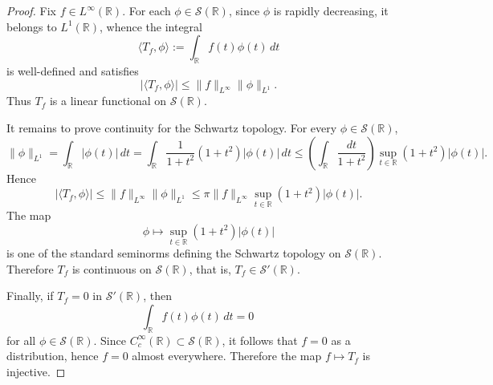 \documentclass[12pt]{amsart}
\theoremstyle{definition}
\begin{document}
\begin{proof}
Fix $f\in L^\infty(\mathbb R)$. For each $\phi\in \mathcal S(\mathbb R)$, since
$\phi$ is rapidly decreasing, it belongs to $L^1(\mathbb R)$, whence the
integral
\[
\langle T_f,\phi\rangle:=\int_{\mathbb R} f(t)\phi(t)\,dt
\]
is well-defined and satisfies
\[
|\langle T_f,\phi\rangle|
\le \|f\|_{L^\infty}\|\phi\|_{L^1}.
\]
Thus $T_f$ is a linear functional on $\mathcal S(\mathbb R)$.

It remains to prove continuity for the Schwartz topology. For every
$\phi\in \mathcal S(\mathbb R)$,
\[
\|\phi\|_{L^1}
=
\int_{\mathbb R} |\phi(t)|\,dt
=
\int_{\mathbb R} \frac{1}{1+t^2}(1+t^2)|\phi(t)|\,dt
\le
\left(\int_{\mathbb R}\frac{dt}{1+t^2}\right)
\sup_{t\in\mathbb R}(1+t^2)|\phi(t)|.
\]
Hence
\[
|\langle T_f,\phi\rangle|
\le
\|f\|_{L^\infty}\|\phi\|_{L^1}
\le
\pi \|f\|_{L^\infty}\sup_{t\in\mathbb R}(1+t^2)|\phi(t)|.
\]
The map
\[
\phi\longmapsto \sup_{t\in\mathbb R}(1+t^2)|\phi(t)|
\]
is one of the standard seminorms defining the Schwartz topology on
$\mathcal S(\mathbb R)$. Therefore $T_f$ is continuous on $\mathcal S(\mathbb R)$,
that is, $T_f\in \mathcal S'(\mathbb R).$

Finally, if $T_f=0$ in $\mathcal S'(\mathbb R)$, then
\[
\int_{\mathbb R} f(t)\phi(t)\,dt=0
\qquad
\]
for all $\phi\in \mathcal S(\mathbb R)$.
Since $C_c^\infty(\mathbb R)\subset \mathcal S(\mathbb R)$, it follows that
$f=0$ as a distribution, hence $f=0$ almost everywhere. Therefore the map
$f\mapsto T_f$ is injective.
\end{proof}
\end{document}
